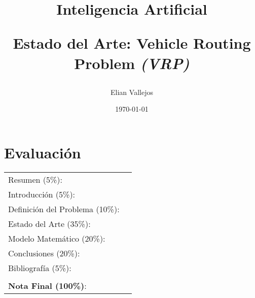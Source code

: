 \documentclass[letter, 10pt]{article}
\begin{document}
\title{Inteligencia Artificial \\ \begin{Large}Estado del Arte: Vehicle Routing Problem \emph{(VRP)}\end{Large}}
\author{Elian Vallejos}
\date{\today}
\maketitle


\section*{Evaluaci\'on}

\begin{tabular}{ll}
Resumen (5\%): & \underline{\hspace{2cm}} \\
Introducci\'on (5\%):  & \underline{\hspace{2cm}} \\
Definici\'on del Problema (10\%):  & \underline{\hspace{2cm}} \\
Estado del Arte (35\%):  & \underline{\hspace{2cm}} \\
Modelo Matem\'atico (20\%): &  \underline{\hspace{2cm}}\\
Conclusiones (20\%): &  \underline{\hspace{2cm}}\\
Bibliograf\'ia (5\%): & \underline{\hspace{2cm}}\\
 &  \\
\textbf{Nota Final (100\%)}:   & \underline{\hspace{2cm}}
\end{tabular}
\vspace{2cm}
\end{document}
